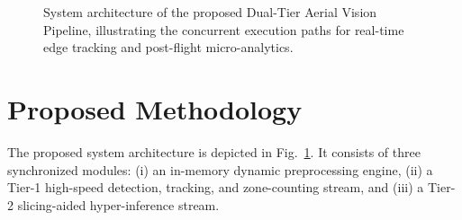 \documentclass[conference]{IEEEtran}
\begin{document}
\begin{figure}[!t]
\centering
{}
\caption{System architecture of the proposed Dual-Tier Aerial Vision Pipeline, illustrating the concurrent execution paths for real-time edge tracking and post-flight micro-analytics.}
\label{fig:pipeline_arch}
\end{figure}

\section{Proposed Methodology}

The proposed system architecture is depicted in Fig.~\ref{fig:pipeline_arch}. It consists of three synchronized modules: (i) an in-memory dynamic preprocessing engine, (ii) a Tier-1 high-speed detection, tracking, and zone-counting stream, and (iii) a Tier-2 slicing-aided hyper-inference stream.
\end{document}
